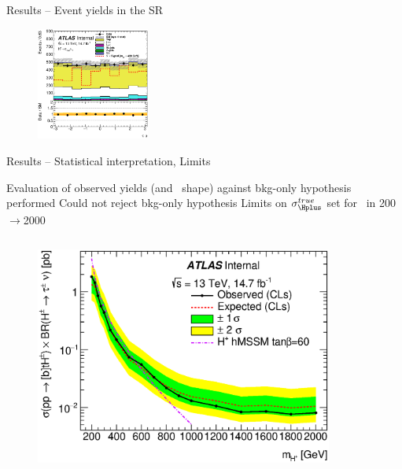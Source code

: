 \documentclass[10pt]{beamer}
\begin{document}
\begin{frame}{Results -- Event yields in the SR}
\begin{figure}
   \includegraphics[width=0.33\textwidth]{figures/tauPhi_SR.eps}
\end{figure}
\end{frame}

\begin{frame}{Results -- Statistical interpretation, Limits}
\begin{outline}
\1 Evaluation of observed yields (and \mT\ shape) against bkg-only hypothesis performed
	\2 Could not reject bkg-only hypothesis
\1 Limits on $\sigma_{\Hplus}^{true}$ set for \mcH\ in 200$\to$2000~\GeV
\end{outline}
\vspace*{-\baselineskip}
\begin{columns}
	\begin{column}{0.5\linewidth}
\begin{figure}
					 \includegraphics[width=\textwidth]{figures/final_limits_sys_asym_limit_log.eps}
\end{figure}
	\end{column}
	\begin{column}{0.5\linewidth}
\begin{figure}

\end{figure}
\end{column}
\end{columns}
\end{frame}
\end{document}
